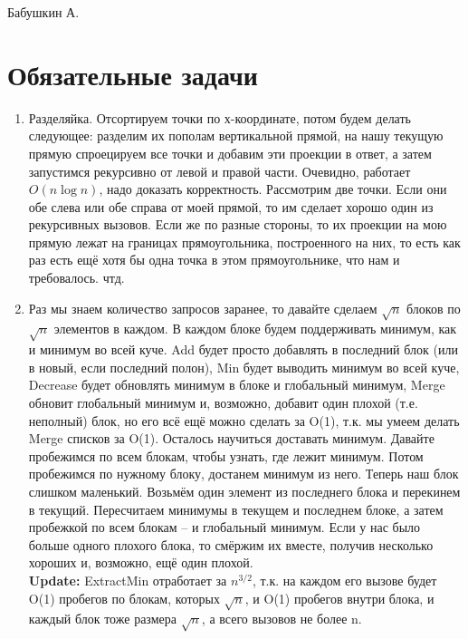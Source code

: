 \documentclass[12pt]{article}
\begin{document}
\def\t{\texttt}

Бабушкин А.

\section{Обязательные задачи}

\begin{enumerate}
	\setlength{\parskip}{0pt} 
	\setlength{\itemsep}{0pt} 
	\item Разделяйка. Отсортируем точки по х-координате, потом будем делать следующее: разделим их пополам вертикальной прямой, на нашу текущую прямую спроецируем все точки и добавим эти проекции в ответ, а затем запустимся рекурсивно от левой и правой части. Очевидно, работает $O(n\log n)$, надо доказать корректность. Рассмотрим две точки. Если они обе слева или обе справа от моей прямой, то им сделает хорошо один из рекурсивных вызовов. Если же по разные стороны, то их проекции на мою прямую лежат на границах прямоугольника, построенного на них, то есть как раз есть ещё хотя бы одна точка в этом прямоугольнике, что нам и требовалось. чтд. \\
	\item Раз мы знаем количество запросов заранее, то давайте сделаем $\sqrt n$ блоков по $\sqrt n$ элементов в каждом. В каждом блоке будем поддерживать минимум, как и минимум во всей куче. Add будет просто добавлять в последний блок (или в новый, если последний полон), Min будет выводить минимум во всей куче, Decrease будет обновлять минимум в блоке и глобальный минимум, Merge обновит глобальный минимум и, возможно, добавит один плохой (т.е. неполный) блок, но его всё ещё можно сделать за O(1), т.к. мы умеем делать Merge списков за O(1). Осталось научиться доставать минимум. Давайте пробежимся по всем блокам, чтобы узнать, где лежит минимум. Потом пробежимся по нужному блоку, достанем минимум из него. Теперь наш блок слишком маленький. Возьмём один элемент из последнего блока и перекинем в текущий. Пересчитаем минимумы в текущем и последнем блоке, а затем пробежкой по всем блокам -- и глобальный минимум. Если у нас было больше одного плохого блока, то смёржим их вместе, получив несколько хороших и, возможно, ещё один плохой. \\
	\textbf{Update:} ExtractMin отработает за $n^{3/2}$, т.к. на каждом его вызове будет O(1) пробегов по блокам, которых $\sqrt n$, и O(1) пробегов внутри блока, и каждый блок тоже размера $\sqrt n$, а всего вызовов не более n. \\

\end{enumerate}
\end{document}
